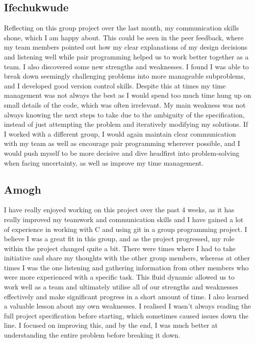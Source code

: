 \documentclass[11pt]{article}
\begin{document}
\subsection{Ifechukwude}
Reflecting on this group project over the last month, my communication skills shone, which I am happy about. This could be seen in the peer feedback, where my team members pointed out how my clear explanations of my design decisions and listening well while pair programming helped us to work better together as a team. I also discovered some new strengths and weaknesses. I found I was able to break down seemingly challenging problems into more manageable subproblems, and I developed good version control skills. Despite this at times my time management was not always the best as I would spend too much time hung up on small details of the code, which was often irrelevant. My main weakness was not always knowing the next steps to take due to the ambiguity of the specification, instead of just attempting the problem and iteratively modifying my solutions. If I worked with a different group, I would again maintain clear communication with my team as well as encourage pair programming wherever possible, and I would push myself to be more decisive and dive headfirst into problem-solving when facing uncertainty, as well as improve my time management.

\subsection{Amogh}
I have really enjoyed working on this project over the past 4 weeks, as it has really improved my teamwork and communication skills and I have gained a lot of experience in working with C and using git in a group programming project. I believe I was a great fit in this group, and as the project progressed, my role within the project changed quite a bit. There were times where I had to take initiative and share my thoughts with the other group members, whereas at other times I was the one listening and gathering information from other members who were more experienced with a specific task. This fluid dynamic allowed us to work well as a team and ultimately utilise all of our strengths and weaknesses effectively and make significant progress in a short amount of time. I also learned a valuable lesson about my own weaknesses. I realised I wasn't always reading the full project specification before starting, which sometimes caused issues down the line. I focused on improving this, and by the end, I was much better at understanding the entire problem before breaking it down.
\end{document}
